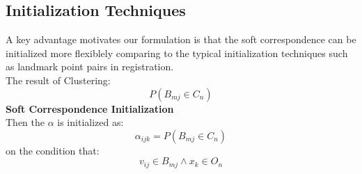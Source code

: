\subsection{Initialization Techniques}
A key advantage motivates our formulation is that the soft correspondence can be initialized more flexiblely comparing to the typical initialization techniques such as landmark point pairs in registration.\\
The result of Clustering:
$$P(B_{mj} \in C_n)$$
\textbf{Soft Correspondence Initialization}\\
Then the $\alpha$ is initialized as:
$$\alpha_{ijk}=P(B_{mj} \in C_n)$$
on the condition that:
$$v_{ij} \in B_{mj} \wedge x_k \in O_n$$